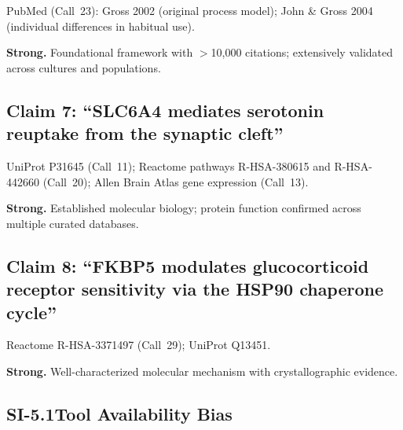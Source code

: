 \begin{description}[style=nextline, nosep]
  \item[Evidence source]
    PubMed (Call~23): Gross 2002 (original process model);
    John \& Gross 2004 (individual differences in habitual use).
  \item[Grade] \textbf{Strong.}  Foundational framework with $>$10,000
    citations; extensively validated across cultures and populations.
\end{description}

\subsection*{Claim 7: ``SLC6A4 mediates serotonin reuptake from the
synaptic cleft''}

\begin{description}[style=nextline, nosep]
  \item[Evidence source]
    UniProt P31645 (Call~11); Reactome pathways R-HSA-380615 and
    R-HSA-442660 (Call~20); Allen Brain Atlas gene expression (Call~13).
  \item[Grade] \textbf{Strong.}  Established molecular biology; protein
    function confirmed across multiple curated databases.
\end{description}

\subsection*{Claim 8: ``FKBP5 modulates glucocorticoid receptor sensitivity
via the HSP90 chaperone cycle''}

\begin{description}[style=nextline, nosep]
  \item[Evidence source]
    Reactome R-HSA-3371497 (Call~29); UniProt Q13451.
  \item[Grade] \textbf{Strong.}  Well-characterized molecular mechanism with
    crystallographic evidence.
\end{description}


\subsection*{SI-5.1\quad Tool Availability Bias}

